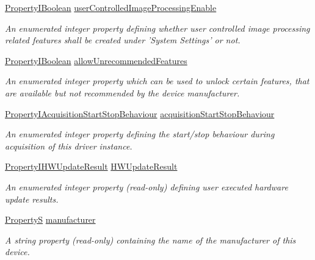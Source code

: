 \begin{DoxyCompactItemize}
\hyperlink{group___common_interface_ga44f9437e24b21b6c93da9039ec6786aa}{Property\+I\+Boolean} \hyperlink{classmv_i_m_p_a_c_t_1_1acquire_1_1_device_a4d5db996353c3b9ada5f6a15fb19f9eb}{user\+Controlled\+Image\+Processing\+Enable}
\begin{DoxyCompactList}\small\item\em An enumerated integer property defining whether user controlled image processing related features shall be created under 'System Settings' or not. \end{DoxyCompactList}\item 
\hyperlink{group___common_interface_ga44f9437e24b21b6c93da9039ec6786aa}{Property\+I\+Boolean} \hyperlink{classmv_i_m_p_a_c_t_1_1acquire_1_1_device_a1cce00cf697d950dace425bcc7a61b82}{allow\+Unrecommended\+Features}
\begin{DoxyCompactList}\small\item\em An enumerated integer property which can be used to unlock certain features, that are available but not recommended by the device manufacturer. \end{DoxyCompactList}\item 
\hyperlink{group___common_interface_ga4b53c0f0c5478e5c079b4c2082c53690}{Property\+I\+Acquisition\+Start\+Stop\+Behaviour} \hyperlink{classmv_i_m_p_a_c_t_1_1acquire_1_1_device_aa5cdb4615de973bbf1c24f2fd5a3d1b5}{acquisition\+Start\+Stop\+Behaviour}
\begin{DoxyCompactList}\small\item\em An enumerated integer property defining the start/stop behaviour during acquisition of this driver instance. \end{DoxyCompactList}\item 
\hyperlink{group___common_interface_ga111916e947fe10d171bc6c2a10f15ae2}{Property\+I\+H\+W\+Update\+Result} \hyperlink{classmv_i_m_p_a_c_t_1_1acquire_1_1_device_a8e6d960358632d3e55f2f20474a3aa26}{H\+W\+Update\+Result}
\begin{DoxyCompactList}\small\item\em An enumerated integer property {\bfseries }(read-\/only) defining user executed hardware update results. \end{DoxyCompactList}\item 
\hyperlink{classmv_i_m_p_a_c_t_1_1acquire_1_1_property_s}{Property\+S} \hyperlink{classmv_i_m_p_a_c_t_1_1acquire_1_1_device_aa3ee34abadfd5192050fb3281282190d}{manufacturer}
\begin{DoxyCompactList}\small\item\em A string property {\bfseries }(read-\/only) containing the name of the manufacturer of this device. \end{DoxyCompactList}\item 

\end{DoxyCompactItemize}
